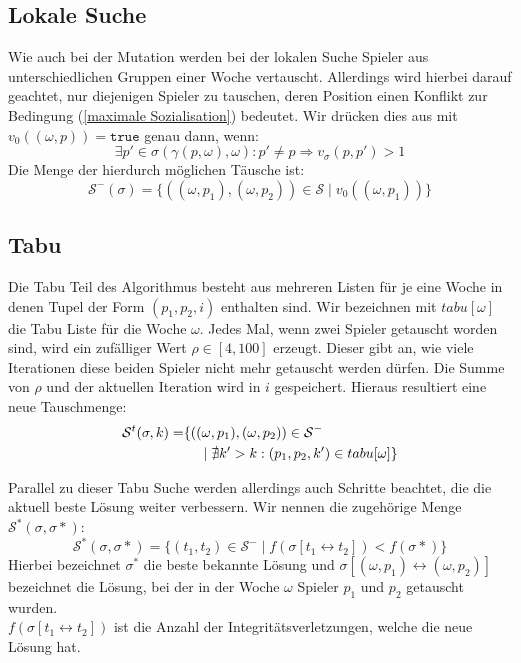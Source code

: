 \subsection{Lokale Suche}
Wie auch bei der Mutation werden bei der lokalen Suche Spieler aus unterschiedlichen Gruppen einer Woche vertauscht. 
Allerdings wird hierbei darauf geachtet, nur diejenigen Spieler zu tauschen, deren Position einen Konflikt zur  Bedingung (\ref{maximale Sozialisation}) bedeutet. 
Wir drücken dies aus mit $v_0((\omega, p)) = \texttt{true}$ genau dann, wenn:
\begin{equation}
  \exists p' \in \sigma(\gamma(p,\omega), \omega): p' \neq p \Rightarrow v_\sigma(p, p') > 1
\end{equation}
Die Menge der hierdurch möglichen Täusche ist:
\begin{equation}
  \mathcal{S}^-(\sigma) = \{ ((\omega, p_1), (\omega, p_2)) \in \mathcal{S} \;|\; v_0((\omega, p_1)) \}
\end{equation}


\subsection{Tabu}
Die Tabu Teil des Algorithmus besteht aus mehreren Listen für je eine Woche in denen Tupel der Form $(p_1, p_2, i)$ enthalten sind. Wir bezeichnen mit $tabu[\omega]$ die Tabu Liste für die Woche $\omega$. 
Jedes Mal, wenn zwei Spieler getauscht worden sind, wird ein zufälliger Wert $\rho \in [4, 100]$ erzeugt. Dieser gibt an, wie viele Iterationen diese beiden Spieler nicht mehr getauscht werden dürfen. Die Summe von $\rho$ und der aktuellen Iteration wird in $i$ gespeichert. Hieraus resultiert eine neue Tauschmenge:
\begin{equation}
\begin{split} 
  \mathcal{S}^t(\sigma, k) = & \{ ((\omega, p_1), (\omega, p_2)) \in \mathcal{S}^- \\
    & \hspace{5 mm} | \; \nexists k' > k: (p_1, p_2, k') \in tabu[\omega] \}
\end{split} 
\end{equation}

Parallel zu dieser Tabu Suche werden allerdings auch Schritte beachtet, die die aktuell beste Lösung weiter verbessern. Wir nennen die zugehörige Menge $\mathcal{S}^*(\sigma, \sigma*)$:
\begin{equation}
  \mathcal{S}^*(\sigma, \sigma*) = \{ (t_1, t_2) \in \mathcal{S}^- \;|\; f(\sigma [t_1 \leftrightarrow t_2] ) < f(\sigma *) \}
\end{equation}
Hierbei bezeichnet $\sigma^*$ die beste bekannte Lösung und $\sigma [(\omega, p_1) \leftrightarrow (\omega, p_2)]$ bezeichnet die Lösung, bei der in der  Woche $\omega$ Spieler $p_1$ und $p_2$ getauscht wurden.\\
$f(\sigma [t_1 \leftrightarrow t_2])$ ist die Anzahl der Integritätsverletzungen, welche die neue Lösung hat.


